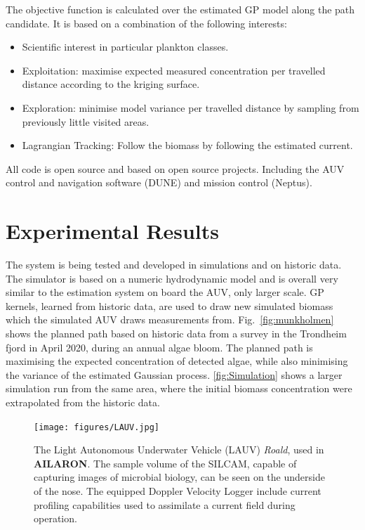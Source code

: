 \documentclass[conference]{IEEEtran}
\def\proje{{\textbf{AILARON}}}
\newcommand{\cmt}[1]{{\color{red}{#1}}}
\begin{document}
The objective function is calculated over the estimated GP model along
the path candidate. It is based on a combination of the following interests:
\begin{itemize}
    \item Scientific interest in particular plankton classes. 
    \item Exploitation: maximise expected measured concentration per travelled distance
      according to the kriging surface. 
    \item Exploration: minimise model variance per travelled distance by sampling from
      previously little visited areas.
    \item Lagrangian Tracking: Follow the biomass by following the estimated current.
\end{itemize}
All code is open source and based on open source projects. Including
the AUV control and navigation software (DUNE) and mission control
(Neptus)\cite{pinto2013lsts}.

\section{Experimental Results}

The system is being tested and developed in simulations and on historic
data.
The simulator is based on a numeric hydrodynamic model and is overall
very similar to the estimation system on board the AUV, only larger scale.
GP kernels, learned from historic data, are used to draw new simulated biomass which the simulated AUV draws measurements from. 
Fig.~\ref{fig:munkholmen} shows the planned path based on historic
data from a survey in the Trondheim fjord in April 2020, during an
annual algae bloom. The planned path is maximising the expected
concentration of detected algae, while also minimising the variance of
the estimated Gaussian process.
\cref{fig:Simulation} shows a larger simulation run from the same area, where the initial biomass concentration were extrapolated from the historic data.

\begin{figure}[htbp]
  \centering
  \texttt{[image: figures/LAUV.jpg]}
  \caption{The Light Autonomous Underwater Vehicle (LAUV)
    \emph{Roald}, used in \proje. The sample volume of the SILCAM,
    capable of capturing images of microbial biology, can be seen on
    the underside of the nose. The equipped Doppler Velocity Logger
    include current profiling capabilities used to assimilate a
    current field during operation.}
  \label{fig:roald}
\end{figure}
\end{document}

